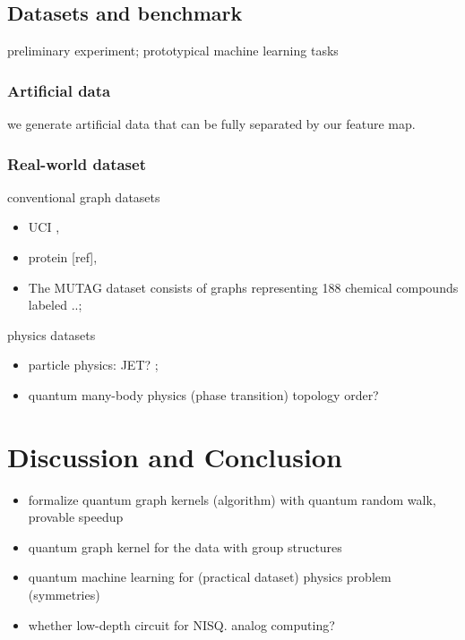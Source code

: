 \subsection{Datasets and benchmark}
preliminary experiment;
prototypical machine learning tasks

\subsubsection{Artificial data}
we generate artificial data that can be fully separated by our feature map.

\subsubsection{Real-world dataset}
conventional graph datasets
\begin{itemize}
	\item UCI \cite{kondorDiffusionKernelsGraphs2002}, 
	\item protein [ref], 
	\item The MUTAG dataset consists of graphs representing 188 chemical compounds labeled ..;
\end{itemize}
physics datasets
\begin{itemize}
	\item particle physics: JET? \cite{bogatskiyLorentzGroupEquivariant2020}; 

	\item quantum many-body physics (phase transition)
	\cite{carrasquillaMachineLearningPhases2017} 
	topology order?
	\cite{congQuantumConvolutionalNeural2019}
\end{itemize}

\section{Discussion and Conclusion}\label{sec:discussion}
\begin{itemize}
	\item formalize quantum graph kernels (algorithm) with quantum random walk, provable speedup
	\item quantum graph kernel for the data with group structures
	\item quantum machine learning for (practical dataset) physics problem (symmetries)
	\item whether low-depth circuit for NISQ. analog computing?
\end{itemize}

